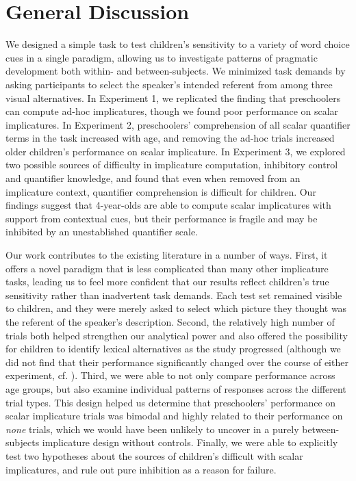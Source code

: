 \documentclass[man]{apa2}
\begin{document}
{\section{General Discussion}

We designed a simple task to test children's sensitivity to a variety of word choice cues in a single paradigm, allowing us to investigate patterns of pragmatic development both within- and between-subjects. We minimized task demands by asking participants to select the speaker's intended referent from among three visual alternatives. In Experiment 1, we replicated the finding that preschoolers can compute ad-hoc implicatures, though we found poor performance on scalar implicatures. In Experiment 2, preschoolers' comprehension of all scalar quantifier terms in the task increased with age, and removing the ad-hoc trials increased older children's performance on scalar implicature. In Experiment 3, we explored two possible sources of difficulty in implicature computation, inhibitory control and quantifier knowledge, and found that even when removed from an implicature context, quantifier comprehension is difficult for children.  Our findings suggest that 4-year-olds are able to compute scalar implicatures with support from contextual cues, but their performance is fragile and may be inhibited by an unestablished quantifier scale.

Our work contributes to the existing literature in a number of ways. First, it offers a novel paradigm that is less complicated than many other implicature tasks, leading us to feel more confident that our results reflect children's true sensitivity rather than inadvertent task demands. Each test set remained visible to children, and they were merely asked to select which picture they thought was the referent of the speaker's description. Second, the relatively high number of trials both helped strengthen our analytical power and also offered the possibility for children to identify lexical alternatives as the study progressed (although we did not find that their performance significantly changed over the course of either experiment, cf. ). Third, we were able to not only compare performance across age groups, but also examine individual patterns of responses across the different trial types. This design helped us determine that preschoolers' performance on scalar implicature trials was bimodal and highly related to their performance on \emph{none} trials, which we would have been unlikely to uncover in a purely between-subjects implicature design without controls. Finally, we were able to explicitly test two hypotheses about the sources of children's difficult with scalar implicatures, and rule out pure inhibition as a reason for failure.

}
\end{document}
